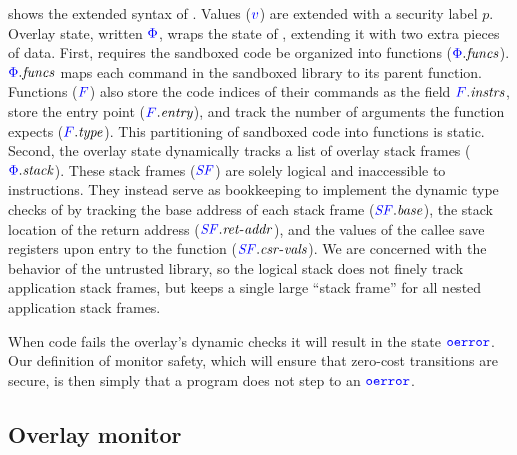 %
 shows the extended syntax of \olangname{}.
%
Values (${\color{blue}{v}}$) are extended with a security label $p$.
%
Overlay state, written ${\color{blue}{\Phi}}$, wraps the state of \langname{}, extending it
with two extra pieces of data.
%
First, \olangname{} requires the sandboxed code be organized into functions
(${\color{blue}{\Phi}}.\mathit{funcs}$).
%
${\color{blue}{\Phi}}.\mathit{funcs}$ maps each command in the sandboxed library to its
parent function.
%
Functions (${\color{blue}{F}}$) also store the code indices of their commands as the field
${\color{blue}{F}}.\mathit{instrs}$, store the entry point (${\color{blue}{F}}.\mathit{entry}$),
and track the number of arguments the function expects (${\color{blue}{F}}.\mathit{type}$).
%
This partitioning of sandboxed code into functions is static.
%
Second, the overlay state dynamically tracks a list of overlay stack frames
(${\color{blue}{\Phi}}.\mathit{stack}$).
%
These stack frames (${\color{blue}{\ensuremath{\mathit{SF}}}}$) are solely logical and inaccessible to instructions.
%
They instead serve as bookkeeping to implement the dynamic type checks of
\olangname{} by tracking the base address of each stack frame
(${\color{blue}{\ensuremath{\mathit{SF}}}}.\mathit{base}$), the stack location of the return address
(${\color{blue}{\ensuremath{\mathit{SF}}}}.\mathit{ret\mbox{-}addr}$), and the values of the callee
save registers upon entry to the function (${\color{blue}{\ensuremath{\mathit{SF}}}}.\mathit{csr\mbox{-}vals}$).
%
We are concerned with the behavior of the untrusted library, so the logical
stack does not finely track application stack frames, but keeps a single large
``stack frame'' for all nested application stack frames.

When code fails the overlay's dynamic checks it will result in the state
${\color{blue}{\mathtt{oerror}}}$.
%
Our definition of monitor safety, which will ensure that zero-cost transitions
are secure, is then simply that a program does not step to an ${\color{blue}{\mathtt{oerror}}}$.

\subsection{Overlay monitor} \label{subsec:overlay-monitor-def}

